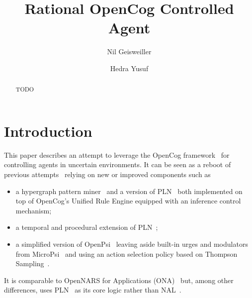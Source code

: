 \documentclass[runningheads]{llncs}
\begin{document}
%
\title{Rational OpenCog Controlled Agent}

%
\author{Nil Geisweiller
  \and Hedra Yusuf}
%
%
%
\maketitle              %
%

\begin{abstract}
  TODO

\end{abstract}

\section{Introduction}

This paper describes an attempt to leverage the OpenCog
framework~\cite{Hart2008} for controlling agents in uncertain
environments.  It can be seen as a reboot of previous
attempts~\cite{Goertzel2008, Goertzel2011, Cai2011, Cai2013} relying
on new or improved components such as
\begin{itemize}
\item a hypergraph pattern miner~\cite{Geisweiller2019} and a version
  of PLN~\cite{Goertzel2009} both implemented on top of OpenCog's
  Unified Rule Engine equipped with an inference control mechanism;
\item a temporal and procedural extension of
  PLN~\cite{Geisweiller2023TPLN};
\item a simplified version of OpenPsi~\cite{Cai2011, Cai2013} leaving
  aside built-in urges and modulators from MicroPsi~\cite{Bach2012}
  and using an action selection policy based on Thompson
  Sampling~\cite{Leike2016}.
\end{itemize}
It is comparable to OpenNARS for Applications (ONA)~\cite{Hammer2020}
but, among other differences, uses PLN~\cite{Goertzel2009} as its core
logic rather than NAL~\cite{Wang2011}.
\end{document}
